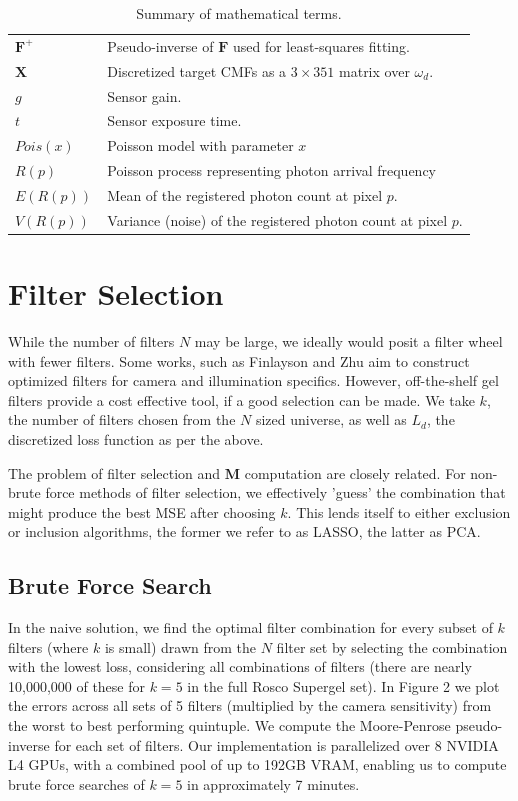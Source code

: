\begin{table}[H]
\begin{tabular}{@{}p{0.20\linewidth}p{0.80\linewidth}@{}}
$\boldsymbol{F}^+$ & Pseudo-inverse of $\boldsymbol{F}$ used for least-squares fitting. \\
$\mathbf{X}$ & Discretized target CMFs as a $3\times 351$ matrix over $\omega_d$. \\
$g$ & Sensor gain. \\
$t$ & Sensor exposure time. \\
$Pois(x)$ & Poisson model with parameter $x$ \\
$R(p)$ & Poisson process representing photon arrival frequency\\
$E(R(p))$ & Mean of the registered photon count at pixel $p$. \\
$V(R(p))$ & Variance (noise) of the registered photon count at pixel $p$. \\
\bottomrule
\end{tabular}
\newline
\caption{Summary of mathematical terms.}
\label{tab:math-terms}
\end{table}
\section{Filter Selection}

While the number of filters $N$ may be large, we ideally would posit a filter wheel with fewer filters.
Some works, such as Finlayson and Zhu \cite{finlayson2020designing} aim to construct optimized filters for camera and illumination specifics. 
However, off-the-shelf gel filters provide a cost effective tool, if a good selection can be made. 
We take $k$, the number of filters chosen from the $N$ sized universe, as well as $L_d$, the discretized loss function as per the above.

The problem of filter selection and $\boldsymbol{M}$ computation are closely related. 
For non-brute force methods of filter selection, we effectively 'guess' the combination that might produce the best MSE after choosing $k$.
This lends itself to either exclusion or inclusion algorithms, the former we refer to as LASSO, the latter as PCA. 


\subsection{Brute Force Search}
In the naive solution, we find the optimal filter combination for every subset of $k$ filters (where $k$ is small) drawn from the $N$ filter set by selecting the combination with the lowest loss, considering all combinations of filters (there are nearly 10,000,000 of these for $k=5$ in the full Rosco Supergel set). 
In Figure 2 we plot the errors across all sets of 5 filters (multiplied by the camera sensitivity) from the worst to best performing quintuple. 
We compute the Moore-Penrose pseudo-inverse for each set of filters. 
Our implementation is parallelized over 8 NVIDIA L4 GPUs, with a combined pool of up to 192GB VRAM, enabling us to compute brute force searches of $k=5$ in approximately 7 minutes. 

